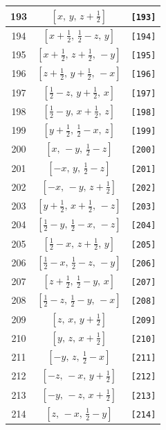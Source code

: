 \documentclass[fleqn,8pt]{jsarticle}
\begin{document}
\begin{longtable}{ccc}
193 & $\left[ x,\, y,\, z + \frac{1}{2} \right]$ & {\tt [193]} \\ \hline
194 & $\left[ x + \frac{1}{2},\, \frac{1}{2} - z,\, y \right]$ & {\tt [194]} \\ \hline
195 & $\left[ x + \frac{1}{2},\, z + \frac{1}{2},\, - y \right]$ & {\tt [195]} \\ \hline
196 & $\left[ z + \frac{1}{2},\, y + \frac{1}{2},\, - x \right]$ & {\tt [196]} \\ \hline
197 & $\left[ \frac{1}{2} - z,\, y + \frac{1}{2},\, x \right]$ & {\tt [197]} \\ \hline
198 & $\left[ \frac{1}{2} - y,\, x + \frac{1}{2},\, z \right]$ & {\tt [198]} \\ \hline
199 & $\left[ y + \frac{1}{2},\, \frac{1}{2} - x,\, z \right]$ & {\tt [199]} \\ \hline
200 & $\left[ x,\, - y,\, \frac{1}{2} - z \right]$ & {\tt [200]} \\ \hline
201 & $\left[ - x,\, y,\, \frac{1}{2} - z \right]$ & {\tt [201]} \\ \hline
202 & $\left[ - x,\, - y,\, z + \frac{1}{2} \right]$ & {\tt [202]} \\ \hline
203 & $\left[ y + \frac{1}{2},\, x + \frac{1}{2},\, - z \right]$ & {\tt [203]} \\ \hline
204 & $\left[ \frac{1}{2} - y,\, \frac{1}{2} - x,\, - z \right]$ & {\tt [204]} \\ \hline
205 & $\left[ \frac{1}{2} - x,\, z + \frac{1}{2},\, y \right]$ & {\tt [205]} \\ \hline
206 & $\left[ \frac{1}{2} - x,\, \frac{1}{2} - z,\, - y \right]$ & {\tt [206]} \\ \hline
207 & $\left[ z + \frac{1}{2},\, \frac{1}{2} - y,\, x \right]$ & {\tt [207]} \\ \hline
208 & $\left[ \frac{1}{2} - z,\, \frac{1}{2} - y,\, - x \right]$ & {\tt [208]} \\ \hline
209 & $\left[ z,\, x,\, y + \frac{1}{2} \right]$ & {\tt [209]} \\ \hline
210 & $\left[ y,\, z,\, x + \frac{1}{2} \right]$ & {\tt [210]} \\ \hline
211 & $\left[ - y,\, z,\, \frac{1}{2} - x \right]$ & {\tt [211]} \\ \hline
212 & $\left[ - z,\, - x,\, y + \frac{1}{2} \right]$ & {\tt [212]} \\ \hline
213 & $\left[ - y,\, - z,\, x + \frac{1}{2} \right]$ & {\tt [213]} \\ \hline
214 & $\left[ z,\, - x,\, \frac{1}{2} - y \right]$ & {\tt [214]} \\ \hline

\end{longtable}
\end{document}
